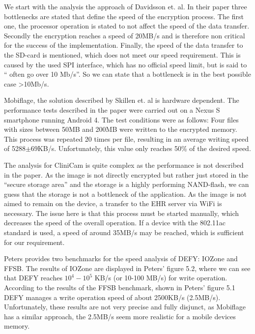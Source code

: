 \documentclass[12pt,a4paper,titlepage,oneside]{scrartcl}
\begin{document}
We start with the analysis the approach of Davidsson et. al.
In their paper three bottlenecks are stated that define the speed of the encryption process.
The first one, the processor operation is stated to not affect the speed of the data transfer.
Secondly the encryption reaches a speed of 20MB/s and is therefore non critical for the success of the implementation.
Finally, the speed of the data transfer to the SD-card is mentioned, which does not meet our speed requirement.
This is caused by the used SPI interface, which has no official speed limit, but is said to `` often go over 10 Mb/s''\cite{leens2009introduction}.
So we can state that a bottleneck is in the best possible case >10Mb/s.

Mobiflage, the solution described by Skillen et. al \cite{skillen2013implementing} is hardware dependent.
The performance tests described in the paper were carried out on a Nexus S smartphone running Android 4.
The test conditions were as follows: 
Four files with sizes between 50MB and 200MB were written to the encrypted memory.
This process was repeated 20 times per file, resulting in an average writing speed of 5288$\pm$69KB/s.
Unfortunately, this value only reaches 50\% of the desired speed.

The analysis for CliniCam \cite{pmid25565678} is quite complex as the performance is not described in the paper.
As the image is not directly encrypted but rather just stored in the ``secure storage area'' and the storage is a highly performing NAND-flash, we can guess that the storage is not a bottleneck of the application.
As the image is not aimed to remain on the device, a transfer to the EHR server via WiFi is necessary.
The issue here is that this process must be started manually, which decreases the speed of the overall operation.
If a device with the 802.11ac standard is used, a speed of around 35MB/s may be reached, which is sufficient for our requirement.

Peters\cite{peters2015defy} provides two benchmarks for the speed analysis of DEFY: IOZone and FFSB.
The results of IOZone are displayed in Peters' figure 5.2, where we can see that DEFY reaches \begin{math} 10^{4}-10^{5}\end{math} KB/s (or 10-100 MB/s) for write operation.
According to the results of the FFSB benchmark, shown in Peters' figure 5.1 DEFY manages a write operation speed of about 2500KB/s (2.5MB/s).
Unfortunately, these results are not very precise and fully disjunct, as Mobiflage has a similar approach, the 2.5MB/s seem more realistic for a mobile devices memory.
\end{document}
